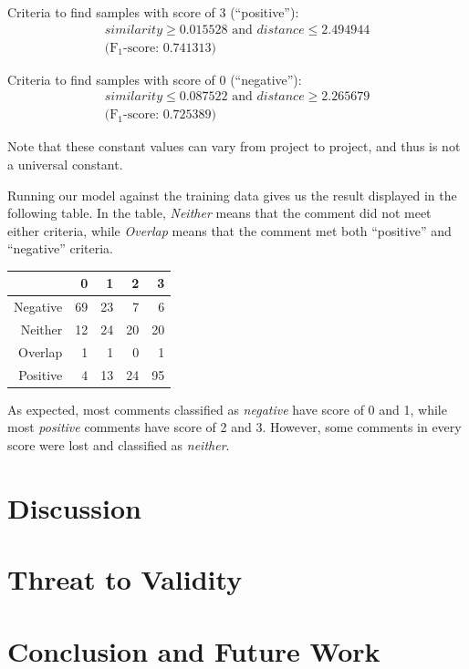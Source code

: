 \documentclass[conference]{IEEEtran}
\begin{document}
Criteria to find samples with score of 3 (``positive''):
\begin{gather*} similarity \geq 0.015528 \text{ and } distance \leq 2.494944
\\ \text{(F$_1$-score: 0.741313)} \end{gather*}

Criteria to find samples with score of 0 (``negative''):
\begin{gather*} similarity \leq 0.087522 \text{ and } distance \geq 2.265679
\\ \text{(F$_1$-score: 0.725389)}\end{gather*}

Note that these constant values can vary from project to project, and thus is not a universal constant.


Running our model against the training data gives us the result displayed in the following table.
In the table, \emph{Neither} means that the comment did not meet either criteria, while \emph{Overlap} means that the comment  met both ``positive'' and ``negative'' criteria.

\begin{center}
\begin{tabular}{|r|rrrr|}
\hline
& \bfseries 0 & \bfseries 1 & \bfseries 2 & \bfseries 3 \\
\hline
Negative & 69 & 23 & 7 & 6 \\
Neither & 12 & 24 & 20 & 20 \\
Overlap & 1 & 1 & 0 & 1 \\
Positive & 4 & 13 & 24 & 95 \\
\hline
\end{tabular}
\end{center}

As expected, most comments classified as \emph{negative} have score of 0 and 1,
while most \emph{positive} comments have score of 2 and 3.
However, some comments in every score were lost and classified as \emph{neither}.



\section{Discussion}





\section{Threat to Validity}


\section{Conclusion and Future Work}


\IEEEpeerreviewmaketitle







\end{document}
